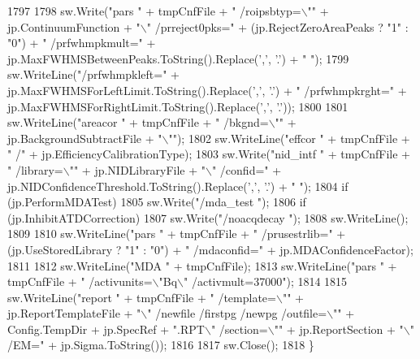 \begin{DoxyCode}
1797 
1798             sw.Write(\textcolor{stringliteral}{"pars "} + tmpCnfFile + \textcolor{stringliteral}{" /roipsbtyp=\(\backslash\)""} + jp.ContinuumFunction + \textcolor{stringliteral}{"\(\backslash\)" /prreject0pks="} +
       (jp.RejectZeroAreaPeaks ? \textcolor{stringliteral}{"1"} : \textcolor{stringliteral}{"0"}) + \textcolor{stringliteral}{" /prfwhmpkmult="} + jp.MaxFWHMSBetweenPeaks.ToString().Replace(\textcolor{charliteral}{','}, \textcolor{charliteral}{
      '.'}) + \textcolor{stringliteral}{" "});
1799             sw.WriteLine(\textcolor{stringliteral}{"/prfwhmpkleft="} + jp.MaxFWHMSForLeftLimit.ToString().Replace(\textcolor{charliteral}{','}, \textcolor{charliteral}{'.'}) + \textcolor{stringliteral}{"
       /prfwhmpkrght="} + jp.MaxFWHMSForRightLimit.ToString().Replace(\textcolor{charliteral}{','}, \textcolor{charliteral}{'.'}));
1800 
1801             sw.WriteLine(\textcolor{stringliteral}{"areacor "} + tmpCnfFile + \textcolor{stringliteral}{" /bkgnd=\(\backslash\)""} + jp.BackgroundSubtractFile + \textcolor{stringliteral}{"\(\backslash\)""});
1802             sw.WriteLine(\textcolor{stringliteral}{"effcor "} + tmpCnfFile + \textcolor{stringliteral}{" /"} + jp.EfficiencyCalibrationType);
1803             sw.Write(\textcolor{stringliteral}{"nid\_intf "} + tmpCnfFile + \textcolor{stringliteral}{" /library=\(\backslash\)""} + jp.NIDLibraryFile + \textcolor{stringliteral}{"\(\backslash\)" /confid="} + 
      jp.NIDConfidenceThreshold.ToString().Replace(\textcolor{charliteral}{','}, \textcolor{charliteral}{'.'}) + \textcolor{stringliteral}{" "});
1804             \textcolor{keywordflow}{if} (jp.PerformMDATest)
1805                 sw.Write(\textcolor{stringliteral}{"/mda\_test "});
1806             \textcolor{keywordflow}{if} (jp.InhibitATDCorrection)
1807                 sw.Write(\textcolor{stringliteral}{"/noacqdecay "});
1808             sw.WriteLine();
1809 
1810             sw.WriteLine(\textcolor{stringliteral}{"pars "} + tmpCnfFile + \textcolor{stringliteral}{" /prusestrlib="} + (jp.UseStoredLibrary ? \textcolor{stringliteral}{"1"} : \textcolor{stringliteral}{"0"}) + \textcolor{stringliteral}{"
       /mdaconfid="} + jp.MDAConfidenceFactor);
1811 
1812             sw.WriteLine(\textcolor{stringliteral}{"MDA "} + tmpCnfFile);
1813             sw.WriteLine(\textcolor{stringliteral}{"pars "} + tmpCnfFile + \textcolor{stringliteral}{" /activunits=\(\backslash\)"Bq\(\backslash\)" /activmult=37000"});
1814 
1815             sw.WriteLine(\textcolor{stringliteral}{"report "} + tmpCnfFile + \textcolor{stringliteral}{" /template=\(\backslash\)""} + jp.ReportTemplateFile + \textcolor{stringliteral}{"\(\backslash\)" /newfile
       /firstpg /newpg /outfile=\(\backslash\)""} + Config.TempDir + jp.SpecRef + \textcolor{stringliteral}{".RPT\(\backslash\)" /section=\(\backslash\)""} + jp.ReportSection + \textcolor{stringliteral}{"\(\backslash\)"
       /EM="} + jp.Sigma.ToString());
1816             
1817             sw.Close();
1818         \}
\end{DoxyCode}
